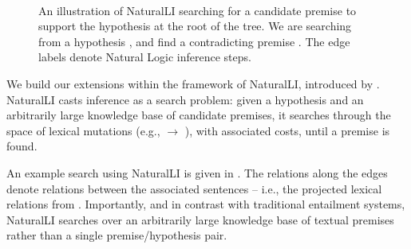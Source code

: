 
%
%

\begin{figure}[t]
\begin{center}
  \resizebox{0.48\textwidth}{!}{\teaserSearch} \\
\end{center}
\caption{
  An illustration of NaturalLI searching for a candidate premise
  to support the hypothesis at the root of the tree.
  We are searching from a hypothesis
  , and find a contradicting
  premise .
  The edge labels denote Natural Logic inference steps.
  \label{fig:naturalli}
}
\end{figure}

We build our extensions within the framework of NaturalLI, introduced
  by .
NaturalLI casts inference as a search problem: given a hypothesis and an arbitrarily
  large knowledge base of candidate premises, it searches through the space of
  lexical mutations (e.g.,  $\rightarrow$ ), 
  with associated costs, until a premise is found.

An example search using NaturalLI is given in .
The relations along the edges denote relations between the associated sentences
  -- i.e., the projected lexical relations from .
Importantly, and in contrast with traditional entailment systems, NaturalLI
  searches over an arbitrarily large knowledge base of textual premises rather
  than a single premise/hypothesis pair.

